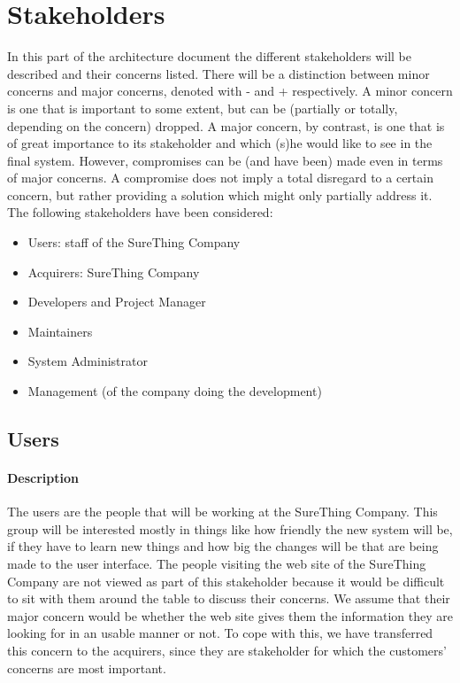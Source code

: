 \chapter{Stakeholders}

In this part of the architecture document the different
stakeholders will be described and their concerns listed.
There will be a distinction between minor concerns and major
concerns, denoted with - and + respectively. A minor concern
is one that is important to some extent, but can be (partially
or totally, depending on the concern) dropped. A major concern,
by contrast, is one that is of great importance to its stakeholder
and which (s)he would like to see in the final system. However,
compromises can be (and have been) made even in terms of major
concerns. A compromise does not imply a total disregard to a certain
concern, but rather providing a solution which might only partially
address it. The following stakeholders have been considered:
\begin{itemize}
\item Users: staff of the SureThing Company
\item Acquirers: SureThing Company
\item Developers and Project Manager
\item Maintainers
\item System Administrator
\item Management (of the company doing the development)
\end{itemize}

\section{Users}

\subsubsection{Description}
The users are the people that will be working at the SureThing
Company. This group will be interested mostly in things like how
friendly the new system will be, if they have to learn new things
and how big the changes will be that are being made to the user
interface. The people visiting the web site of the SureThing Company
are not viewed as part of this stakeholder because it would be difficult
to sit with them around the table to discuss their concerns. We assume
that their major concern would be whether the web site gives them the
information they are looking for in an usable manner or not. To cope with
this, we have transferred this concern to the acquirers, since
they are stakeholder for which the customers' concerns are most
important.

